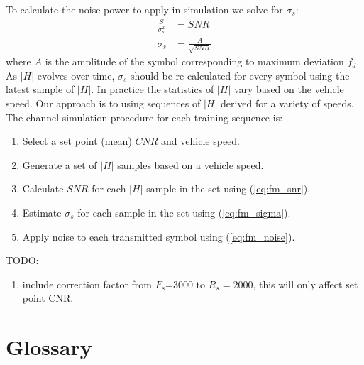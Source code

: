 \documentclass{article}
\begin{document}
To calculate the noise power to apply in simulation we solve for $\sigma_s$:
\begin{equation}
\label{eq:fm_sigma}
\begin{split}
\frac{S}{\sigma_s^2} &= SNR \\
\sigma_s &= \frac{A}{\sqrt{SNR}}
\end{split}
\end{equation}
where $A$ is the amplitude of the symbol corresponding to maximum deviation $f_d$.  As $|H|$ evolves over time, $\sigma_s$ should be re-calculated for every symbol using the latest sample of $|H|$.  In practice the statistics of $|H|$ vary based on the vehicle speed.  Our approach is to using sequences of $|H|$ derived for a variety of speeds.
The channel simulation procedure for each training sequence is:
\begin{enumerate}
\item Select a set point (mean) $CNR$ and vehicle speed.
\item Generate a set of $|H|$ samples based on a vehicle speed.
\item Calculate $SNR$ for each $|H|$ sample in the set using (\ref{eq:fm_snr}). 
\item Estimate $\sigma_s$ for each sample in the set using (\ref{eq:fm_sigma}).
\item Apply noise to each transmitted symbol using (\ref{eq:fm_noise}).
\end{enumerate}

TODO:
\begin{enumerate}
\item include correction factor from $F_s$=3000 to $R_s=2000$, this will only affect set point CNR.
\end{enumerate}

\section{Glossary}
\end{document}
